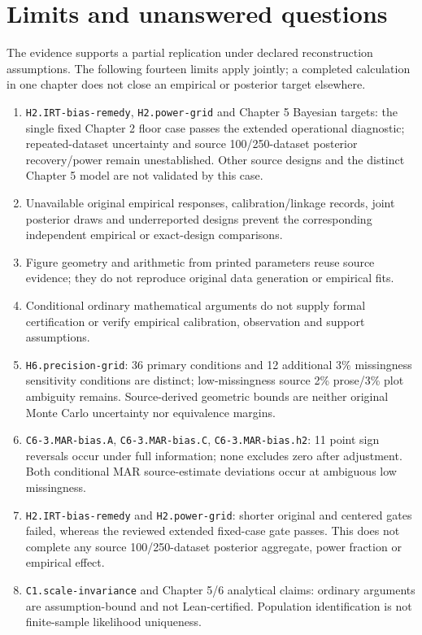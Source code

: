 \documentclass[11pt]{article}
\begin{document}
\section{Limits and unanswered questions}\label{sec:limits}
The evidence supports a partial replication under declared reconstruction assumptions. The following fourteen limits apply jointly; a completed calculation in one chapter does not close an empirical or posterior target elsewhere.
\begin{enumerate}
\item\label{lim:0} \nolinkurl{H2.IRT-bias-remedy}, \nolinkurl{H2.power-grid} and Chapter 5 Bayesian targets: the single fixed Chapter 2 floor case passes the extended operational diagnostic; repeated-dataset uncertainty and source 100/250-dataset posterior recovery/power remain unestablished. Other source designs and the distinct Chapter 5 model are not validated by this case.
\item\label{lim:1} Unavailable original empirical responses, calibration/linkage records, joint posterior draws and underreported designs prevent the corresponding independent empirical or exact-design comparisons.
\item\label{lim:2} Figure geometry and arithmetic from printed parameters reuse source evidence; they do not reproduce original data generation or empirical fits.
\item\label{lim:3} Conditional ordinary mathematical arguments do not supply formal certification or verify empirical calibration, observation and support assumptions.
\item\label{lim:4} \nolinkurl{H6.precision-grid}: 36 primary conditions and 12 additional 3\% missingness sensitivity conditions are distinct; low-missingness source 2\% prose/3\% plot ambiguity remains. Source-derived geometric bounds are neither original Monte Carlo uncertainty nor equivalence margins.
\item\label{lim:5} \nolinkurl{C6-3.MAR-bias.A}, \nolinkurl{C6-3.MAR-bias.C}, \nolinkurl{C6-3.MAR-bias.h2}: 11 point sign reversals occur under full information; none excludes zero after adjustment. Both conditional MAR source-estimate deviations occur at ambiguous low missingness.
\item\label{lim:6} \nolinkurl{H2.IRT-bias-remedy} and \nolinkurl{H2.power-grid}: shorter original and centered gates failed, whereas the reviewed extended fixed-case gate passes. This does not complete any source 100/250-dataset posterior aggregate, power fraction or empirical effect.
\item\label{lim:7} \nolinkurl{C1.scale-invariance} and Chapter 5/6 analytical claims: ordinary arguments are assumption-bound and not Lean-certified. Population identification is not finite-sample likelihood uniqueness.

\end{enumerate}
\end{document}
